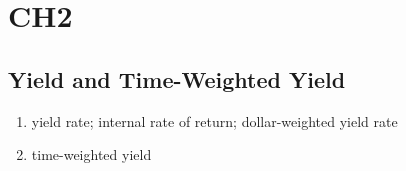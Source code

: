 \documentclass[12pt]{article}
\begin{document}
\section{CH2}
\subsection{Yield and Time-Weighted Yield}
\begin{enumerate}
	\item yield rate; internal rate of return; dollar-weighted yield rate
	\item time-weighted yield
\end{enumerate}
\end{document}

